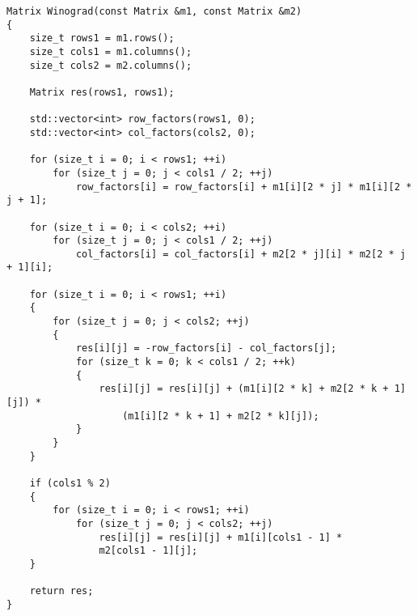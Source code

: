 \clearpage
\begin{lstlisting}[label={lst:winograd}, caption={Реализация алгоритма Винограда}]
Matrix Winograd(const Matrix &m1, const Matrix &m2)
{
    size_t rows1 = m1.rows();
    size_t cols1 = m1.columns();
    size_t cols2 = m2.columns();

    Matrix res(rows1, rows1);

    std::vector<int> row_factors(rows1, 0);
    std::vector<int> col_factors(cols2, 0);

    for (size_t i = 0; i < rows1; ++i)
        for (size_t j = 0; j < cols1 / 2; ++j)
            row_factors[i] = row_factors[i] + m1[i][2 * j] * m1[i][2 * j + 1];

    for (size_t i = 0; i < cols2; ++i)
        for (size_t j = 0; j < cols1 / 2; ++j)
            col_factors[i] = col_factors[i] + m2[2 * j][i] * m2[2 * j + 1][i];

    for (size_t i = 0; i < rows1; ++i)
    {
        for (size_t j = 0; j < cols2; ++j)
        {
            res[i][j] = -row_factors[i] - col_factors[j];
            for (size_t k = 0; k < cols1 / 2; ++k)
            {
                res[i][j] = res[i][j] + (m1[i][2 * k] + m2[2 * k + 1][j]) *
                    (m1[i][2 * k + 1] + m2[2 * k][j]);
            }
        }
    }

    if (cols1 % 2)
    {
        for (size_t i = 0; i < rows1; ++i)
            for (size_t j = 0; j < cols2; ++j)
                res[i][j] = res[i][j] + m1[i][cols1 - 1] *
                m2[cols1 - 1][j];
    }

    return res;
}
\end{lstlisting}

